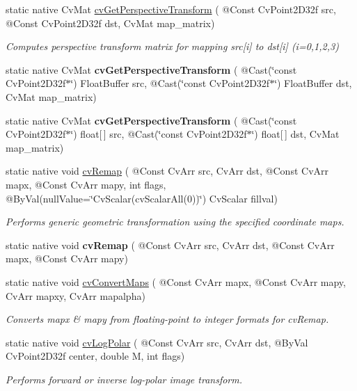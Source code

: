 \begin{DoxyCompactItemize}
static native Cv\+Mat \hyperlink{group__imgproc__c_ga90db3b12f84ee1bea538d6d88bab49c3}{cv\+Get\+Perspective\+Transform} ( @Const Cv\+Point2\+D32f src, @Const Cv\+Point2\+D32f dst, Cv\+Mat map\+\_\+matrix)
\begin{DoxyCompactList}\small\item\em Computes perspective transform matrix for mapping src\mbox{[}i\mbox{]} to dst\mbox{[}i\mbox{]} (i=0,1,2,3) \end{DoxyCompactList}\item 
static native Cv\+Mat {\bfseries cv\+Get\+Perspective\+Transform} ( @Cast(\char`\"{}const Cv\+Point2\+D32f$\ast$\char`\"{}) Float\+Buffer src, @Cast(\char`\"{}const Cv\+Point2\+D32f$\ast$\char`\"{}) Float\+Buffer dst, Cv\+Mat map\+\_\+matrix)
\item 
static native Cv\+Mat {\bfseries cv\+Get\+Perspective\+Transform} ( @Cast(\char`\"{}const Cv\+Point2\+D32f$\ast$\char`\"{}) float\mbox{[}$\,$\mbox{]} src, @Cast(\char`\"{}const Cv\+Point2\+D32f$\ast$\char`\"{}) float\mbox{[}$\,$\mbox{]} dst, Cv\+Mat map\+\_\+matrix)
\item 
static native void \hyperlink{group__imgproc__c_ga5fc4449699da7b00973991b5b610efbb}{cv\+Remap} ( @Const Cv\+Arr src, Cv\+Arr dst, @Const Cv\+Arr mapx, @Const Cv\+Arr mapy, int flags, @By\+Val(null\+Value=\char`\"{}Cv\+Scalar(cv\+Scalar\+All(0))\char`\"{}) Cv\+Scalar fillval)
\begin{DoxyCompactList}\small\item\em Performs generic geometric transformation using the specified coordinate maps. \end{DoxyCompactList}\item 
static native void {\bfseries cv\+Remap} ( @Const Cv\+Arr src, Cv\+Arr dst, @Const Cv\+Arr mapx, @Const Cv\+Arr mapy)
\item 
static native void \hyperlink{group__imgproc__c_ga9e8c4e8b6609f6bad114d7a6e597d530}{cv\+Convert\+Maps} ( @Const Cv\+Arr mapx, @Const Cv\+Arr mapy, Cv\+Arr mapxy, Cv\+Arr mapalpha)
\begin{DoxyCompactList}\small\item\em Converts mapx \& mapy from floating-\/point to integer formats for cv\+Remap. \end{DoxyCompactList}\item 
static native void \hyperlink{group__imgproc__c_gaa181829e06fd0d2f59e112e2a5e27129}{cv\+Log\+Polar} ( @Const Cv\+Arr src, Cv\+Arr dst, @By\+Val Cv\+Point2\+D32f center, double M, int flags)
\begin{DoxyCompactList}\small\item\em Performs forward or inverse log-\/polar image transform. \end{DoxyCompactList}\item 

\end{DoxyCompactItemize}
